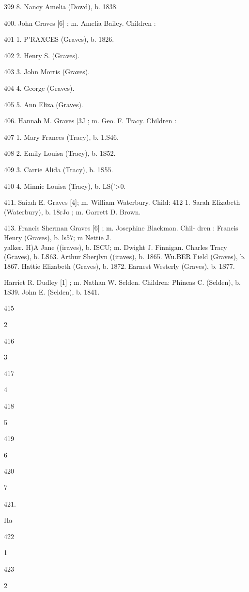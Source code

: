 \documentclass{book}
\begin{document}
399 8. Nancy Amelia (Dowd), b. 1838. 

400. John Graves [6] ; m. Amelia Bailey. Children : 

401 1. P'RAXCES (Graves), b. 1826. 

402 2. Henry S. (Graves). 

403 3. John Morris (Graves). 

404 4. George (Graves). 

405 5. Ann Eliza (Graves). 

406. Hannah M. Graves [3J ; m. Geo. F. Tracy. Children : 

407 1. Mary Frances (Tracy), b. 1.S46. 

408 2. Emily Louisa (Tracy), b. 1S52. 

409 3. Carrie Alida (Tracy), b. 1S55. 

410 4. Minnie Louisa (Tracy), b. LS('>0. 

411. Sai:ah E. Graves [4]; m. William Waterbury. Child: 
412 1. Sarah Elizabeth (Waterbury), b. 18rJo ; m. Garrett D. 
Brown. 

413. Francis Sherman Graves [6] ; m. Josephine Blackman. Chil- 
dren : 
Francis Henry (Graves), b. ls57; m Nettie J. \\yalker. 
H)A Jane ((iraves), b. ISCU; m. Dwight J. Finnigan. 
Charles Tracy (Graves), b. LS63. 
Arthur Sherjlvn ((iraves), b. 1865. 
Wu.BER Field (Graves), b. 1867. 
Hattie Elizabeth (Graves), b. 1872. 
Earnest Westerly (Graves), b. 1S77. 

Harriet R. Dudley [1] ; m. Nathan W. Selden. Children: 
Phineas C. (Selden), b. 1S39. 
John E. (Selden), b. 1841. 



415 


2 


416 


3 


417 


4 


418 


5 


419 


6 


420 


7 


421. 


Ha 


422 


1 


423 


2 
\end{document}

